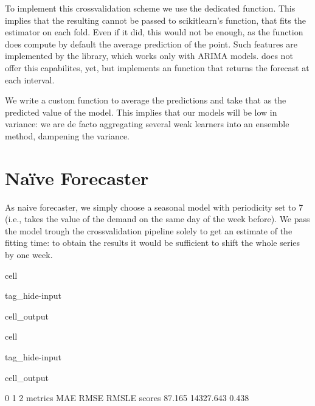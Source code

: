 \documentclass[letterpaper,10pt,english]{jupyterBook}
\begin{document}
\sphinxAtStartPar
To implement this cross\sphinxhyphen{}validation scheme we use the dedicated  function. This implies that the resulting  cannot be passed to scikit\sphinxhyphen{}learn’s  function, that fits the estimator on each fold. Even if it did, this would not be enough, as the function does  compute by default the average prediction of the point. Such features are implemented by the  library, which works only with ARIMA models.  does not offer this capabilites, yet, but implements an  function that returns the forecast at each interval.

\sphinxAtStartPar
We write a custom function to average the predictions and take that as the predicted value of the model. This implies that our models will be low in variance: we are de facto aggregating several weak learners into an ensemble method, dampening the variance.


\section{Naïve Forecaster}
\label{\detokenize{06-forecasting:naive-forecaster}}
\sphinxAtStartPar
As naive forecaster, we simply choose a seasonal model with periodicity set to 7 (i.e., takes the value of the demand on the same day of the week before). We pass the model trough the cross\sphinxhyphen{}validation pipeline solely to get an estimate of the fitting time: to obtain the results it would be sufficient to shift the whole series by one week.

\begin{sphinxuseclass}{cell}
\begin{sphinxuseclass}{tag_hide-input}
\begin{sphinxuseclass}{cell_output}
\noindent{}

\end{sphinxuseclass}
\end{sphinxuseclass}
\end{sphinxuseclass}
\begin{sphinxuseclass}{cell}
\begin{sphinxuseclass}{tag_hide-input}
\begin{sphinxuseclass}{cell_output}
\begin{sphinxVerbatim}[commandchars=\\\{\}]
             0         1      2
metrics    MAE      RMSE  RMSLE
scores  87.165 14327.643  0.438
\end{sphinxVerbatim}

\end{sphinxuseclass}
\end{sphinxuseclass}
\end{sphinxuseclass}
\end{document}
